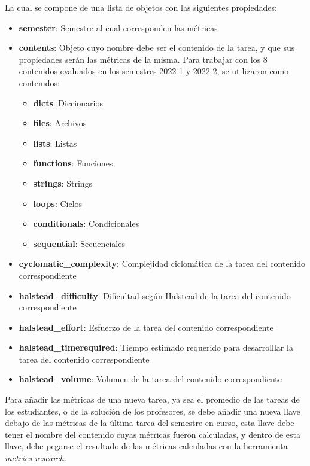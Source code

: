 \documentclass[letterpaper,12pt]{article}
\begin{document}
La cual se compone de una lista de objetos con las siguientes propiedades:
\begin{itemize}
  \item \textbf{semester}: Semestre al cual corresponden las métricas
  \item \textbf{contents}: Objeto cuyo nombre debe ser el contenido de la tarea, y que sus propiedades serán las métricas de la misma. Para trabajar con los 8 contenidos evaluados en los semestres 2022-1 y 2022-2, se utilizaron como contenidos:
        \begin{itemize}
          \item \textbf{dicts}: Diccionarios
          \item \textbf{files}: Archivos
          \item \textbf{lists}: Listas
          \item \textbf{functions}: Funciones
          \item \textbf{strings}: Strings
          \item \textbf{loops}: Ciclos
          \item \textbf{conditionals}: Condicionales
          \item \textbf{sequential}: Secuenciales
        \end{itemize}
  \item \textbf{cyclomatic\_complexity}: Complejidad ciclomática de la tarea del contenido correspondiente
  \item \textbf{halstead\_difficulty}: Dificultad según Halstead de la tarea del contenido correspondiente
  \item \textbf{halstead\_effort}: Esfuerzo de la tarea del contenido correspondiente
  \item \textbf{halstead\_timerequired}: Tiempo estimado requerido para desarrolllar la tarea del contenido correspondiente
  \item \textbf{halstead\_volume}: Volumen de la tarea del contenido correspondiente
\end{itemize}
Para añadir las métricas de una nueva tarea, ya sea el promedio de las tareas de los estudiantes, o de la solución de los profesores, se debe añadir una nueva llave debajo de las métricas de la última tarea del semestre en curso, esta llave debe tener el nombre del contenido cuyas métricas fueron calculadas, y dentro de esta llave, debe pegarse el resultado de las métricas calculadas con la herramienta \textit{metrics-research}.
\end{document}
